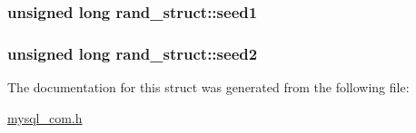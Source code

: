 \subsubsection[{seed1}]{\setlength{\rightskip}{0pt plus 5cm}unsigned long rand\+\_\+struct\+::seed1}\label{structrand__struct_af410f208f593fc00c0da9f9a52ef4e23}
\hypertarget{structrand__struct_a894bfb516e85d530834c0078656d7ba4}{}
\subsubsection[{seed2}]{\setlength{\rightskip}{0pt plus 5cm}unsigned long rand\+\_\+struct\+::seed2}\label{structrand__struct_a894bfb516e85d530834c0078656d7ba4}


The documentation for this struct was generated from the following file\+:\begin{DoxyCompactItemize}
\item 
\hyperlink{mysql__com_8h}{mysql\+\_\+com.\+h}\end{DoxyCompactItemize}

